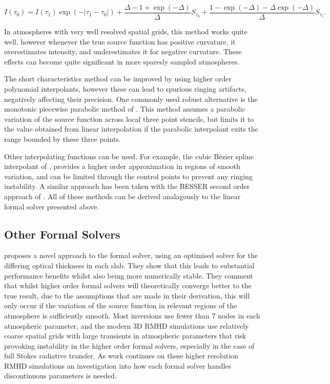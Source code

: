 \begin{equation}
    I(\tau_0) = I(\tau_1) \exp(- |\tau_1 - \tau_0|) +
    \frac{\Delta - 1 + \exp(-\Delta)}{\Delta} S_{\tau_0} +
    \frac{1 - \exp(-\Delta) - \Delta\exp(-\Delta)}{\Delta} S_{\tau_1}.
\end{equation}

In atmospheres with very well resolved spatial grids, this method works quite well, however whenever the true source function has positive curvature, it overestimates intensity, and underestimates it for negative curvature. These effects can become quite significant in more sparesly sampled atmospheres.

The short characteristics method can be improved by using higher order polynomial interpolants, however these can lead to spurious ringing artifacts, negatively affecting their precision. One commonly used robust alternative is the monotonic piecewise parabolic method of \citet{Auer1994}. This method assumes a parabolic variation of the source function across local three point stencils, but limits it to the value obtained from linear interpolation if the parabolic interpolant exits the range bounded by these three points.

Other interpolating functions can be used. For example, the cubic Bézier spline interpolant of \citet{DelaCruzRodriguez2013}, provides a higher order approximation in regions of smooth variation, and can be limited through the control points to prevent any ringing instability. A similar approach has been taken with the BESSER second order approach of \citet{Stepan2013}.
All of these methods can be derived analagously to the linear formal solver presented above.

\subsection{Other Formal Solvers}

\citet{Janett2018} proposes a novel approach to the formal solver,  using an optimised solver for the differing optical thickness in each slab. They show that this leads to substantial performance benefits whilst also being more numerically stable. They comment that whilst higher order formal solvers will theoretically converge better to the true result, due to the assumptions that are made in their derivation, this will only occur if the variation of the source function in relevant regions of the atmosphere is sufficiently smooth. Most inversions use fewer than 7 nodes in each atmospheric parameter, and the modern 3D RMHD simulations use relatively coarse spatial grids with large transients in atmospheric parameters that risk provoking instability in the higher order formal solvers, especially in the case of full Stokes radiative transfer.
As work continues on these higher resolution RMHD simulations an investigation into how each formal solver handles discontinuous parameters is needed.


